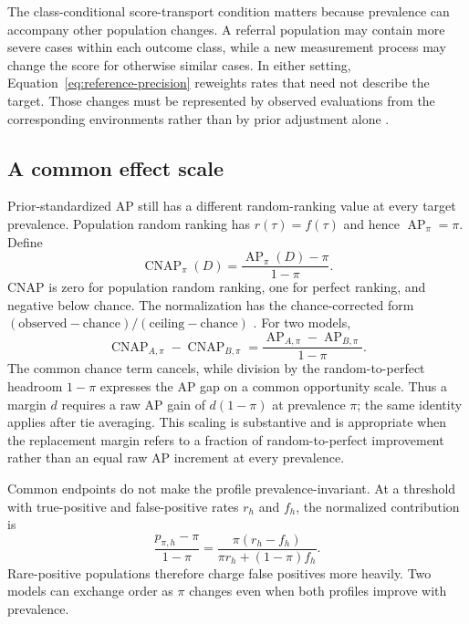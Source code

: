 \documentclass[11pt]{article}
\newcommand{\AP}{\operatorname{AP}}
\newcommand{\CNAP}{\operatorname{CNAP}}
\theoremstyle{remark}
\begin{document}
The class-conditional score-transport condition matters because prevalence can accompany other population changes. A referral population may contain more severe cases within each outcome class, while a new measurement process may change the score for otherwise similar cases. In either setting, Equation~\eqref{eq:reference-precision} reweights rates that need not describe the target. Those changes must be represented by observed evaluations from the corresponding environments rather than by prior adjustment alone \cite{bareinboim2013transportability}.

\subsection{A common effect scale}

Prior-standardized AP still has a different random-ranking value at every target prevalence. Population random ranking has $r(\tau)=f(\tau)$ and hence $\AP_\pi=\pi$. Define
\begin{equation}
\CNAP_\pi(D)
=
\frac{\AP_\pi(D)-\pi}{1-\pi}.
\label{eq:cnap}
\end{equation}
CNAP is zero for population random ranking, one for perfect ranking, and negative below chance. The normalization has the chance-corrected form $(\text{observed}-\text{chance})/(\text{ceiling}-\text{chance})$ \cite{cohen1960coefficient}. For two models,
\begin{equation}
\CNAP_{A,\pi}-\CNAP_{B,\pi}
=
\frac{\AP_{A,\pi}-\AP_{B,\pi}}{1-\pi}.
\label{eq:cnap-difference}
\end{equation}
The common chance term cancels, while division by the random-to-perfect headroom $1-\pi$ expresses the AP gap on a common opportunity scale. Thus a margin $d$ requires a raw AP gain of $d(1-\pi)$ at prevalence $\pi$; the same identity applies after tie averaging. This scaling is substantive and is appropriate when the replacement margin refers to a fraction of random-to-perfect improvement rather than an equal raw AP increment at every prevalence.

Common endpoints do not make the profile prevalence-invariant. At a threshold with true-positive and false-positive rates $r_h$ and $f_h$, the normalized contribution is
\begin{equation}
\frac{p_{\pi,h}-\pi}{1-\pi}
=
\frac{\pi(r_h-f_h)}
{\pi r_h+(1-\pi)f_h}.
\label{eq:threshold-cnap}
\end{equation}
Rare-positive populations therefore charge false positives more heavily. Two models can exchange order as $\pi$ changes even when both profiles improve with prevalence.
\end{document}
